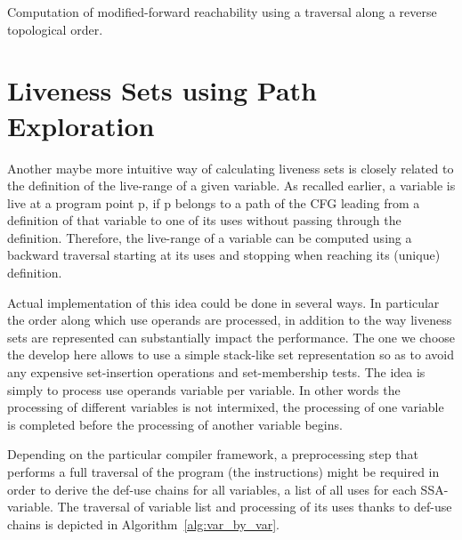 \begin{algorithm}
\caption{Computation of modified-forward reachability using a traversal along a reverse topological order.}
\label{alg:computeFR}
\end{algorithm}

\section{Liveness Sets using Path Exploration}
\label{sec:path-explore}

Another maybe more intuitive way of calculating liveness sets is closely related to the definition of the live-range of a given variable.
As recalled earlier, a variable is live at a program point p, if p belongs to a path of the CFG leading from a definition of that variable to one of its uses without passing through the definition.
Therefore, the live-range of a variable can be computed using a backward traversal starting at its uses and stopping when reaching its (unique) definition.

Actual implementation of this  idea could be done in several ways.
In particular the order along which use operands are processed, in addition to the way liveness sets are represented can substantially impact the performance.
The one we choose the develop here allows to use a simple stack-like set representation so as to avoid any expensive set-insertion operations and set-membership tests.
The idea is simply to process use operands variable per variable.
In other words the processing of different variables is not intermixed, \ie the processing of one variable is completed before the processing of another variable begins.

Depending on the particular compiler framework, a preprocessing step that performs a full traversal of the program (\ie the instructions) might be required in order to derive the def-use chains for all variables, \ie a list of all uses for each SSA-variable.
The traversal of variable list and processing of its uses thanks to def-use chains is depicted in Algorithm~\ref{alg:var_by_var}.

